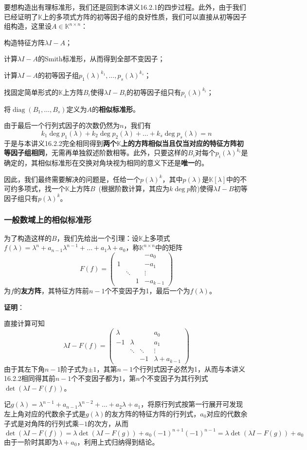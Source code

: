 \documentclass[a4paper,UTF8,fontset=windows,AutoFakeBold]{ctexart}
\DeclareMathOperator{\diag}{diag}
\newcommand{\proo}[1]{{\vspace{5pt}\kaishu\noindent\textbf{证明}：\vspace{-3pt}
\begin{compactitem}
    \item[] #1
\end{compactitem}
}}
\begin{document}
要想构造出有理标准形，我们还是回到本讲义16.2.1的四步过程。此外，由于我们已经证明了$\mathbb{K}$上的多项式方阵的初等因子组的良好性质，我们可以直接从初等因子组构造，这里设$A\in\mathbb{K}^{n\times n}$：
\begin{compactitem}
    \item 构造特征方阵$\lambda I-A$；
    \item 计算$\lambda I-A$的Smith标准形，从而得到全部不变因子；
    \item 计算$\lambda I-A$的初等因子组$p_1(\lambda)^{k_1},\dots,p_s(\lambda)^{k_s}$；
    \item 找固定简单形式的$\mathbb{K}$上方阵$B_i$使得$\lambda I-B_i$的初等因子组只有$p_i(\lambda)^{k_i}$；
    \item 将$\diag(B_1,\dots,B_s)$定义为$A$的\textbf{相似标准形}。
\end{compactitem}
由于最后一个行列式因子的次数仍然为$n$，我们有
$$k_1\deg p_1(\lambda)+k_2\deg p_2(\lambda)+\dots+k_s\deg p_s(\lambda)=n$$
于是与本讲义16.2.2完全相同得到\textbf{两个$\mathbb{K}$上的方阵相似当且仅当对应的特征方阵初等因子组相同}，无需再单独叙述阶数相等。此外，只要这样的$B_i$对每个$p_i(\lambda)^{k_i}$是确定的，其相似标准形在交换对角块视为相同的意义下还是\textbf{唯一}的。

因此，我们最终需要解决的问题是，任给一个$p(\lambda)^k$，其中$p(\lambda)$是$\mathbb{K}[\lambda]$中的不可约多项式，找一个$\mathbb{K}$上方阵$B$\ (根据阶数计算，其应为$k\deg p$阶)使得$\lambda I-B$初等因子组只有$p(\lambda)^k$。

\subsubsection{一般数域上的相似标准形}
为了构造这样的$B$，我们先给出一个引理：设$\mathbb{K}$上多项式$f(\lambda)=\lambda^n+a_{n-1}\lambda^{n-1}+\dots+a_1\lambda+a_0$，称$\mathbb{K}^{n\times n}$中的矩阵
$$F(f)=\begin{pmatrix} &&&-a_0\\1&&&-a_1\\ &\ddots&&\vdots\\ &&1&-a_{k-1}\end{pmatrix}$$
为$f$的\textbf{友方阵}，其特征方阵前$n-1$个不变因子为1，最后一个为$f(\lambda)$。

\proo{
    直接计算可知
    $$\lambda I-F(f)=\begin{pmatrix}\lambda&&&a_0\\-1&\lambda&&a_1\\ &\ddots&\ddots&\vdots\\ &&-1&\lambda+a_{k-1}\end{pmatrix}$$
    由于其左下角$n-1$阶子式为$\pm1$，其第$n-1$个行列式因子必然为1，从而与本讲义16.2.2相同得其前$n-1$个不变因子都为1，第$n$个不变因子为其行列式$\det(\lambda I-F(f))$。

    记$g(\lambda)=\lambda^{n-1}+a_{n-1}\lambda^{n-2}+\dots+a_2\lambda+a_1$，将原行列式按第一行展开可发现左上角对应的代数余子式是$g(\lambda)$的友方阵的特征方阵的行列式，$a_0$对应的代数余子式是对角阵的行列式乘$-1$的次方，从而
    $$\det(\lambda I-F(f))=\lambda\det(\lambda I-F(g))+a_0(-1)^{n+1}(-1)^{n-1}=\lambda\det(\lambda I-F(g))+a_0$$
    由于一阶时其即为$\lambda+a_0$，利用上式归纳得到结论。
}
\end{document}
